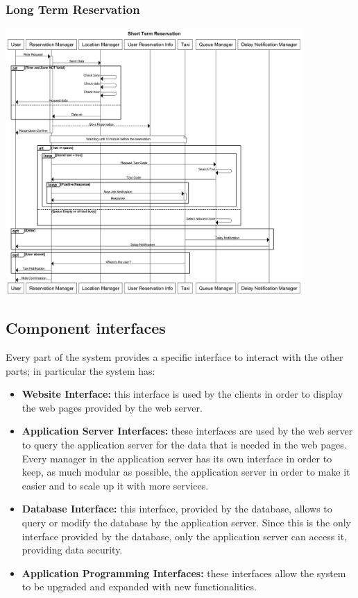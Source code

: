 	\subsubsection{Long Term Reservation}
		\begin{center}
			\includegraphics[width=0.85\textwidth]{./images/Long_Term_Reservation_Complete.png}
		\end{center}
\subsection{Component interfaces}
	Every part of the system provides a specific interface to interact with the other parts; in particular the system has:
	\begin{itemize}
		\item \textbf{Website Interface:} this interface is used by the clients in order to display the web pages provided by the web server.
		\item \textbf{Application Server Interfaces:} these interfaces are used by the web server to query the application server for the data that is needed in the web pages. Every manager in the application server has its own interface in order to keep, as much modular as possible, the application server in order to make it easier and to scale up it with more services.
		\item \textbf{Database Interface:} this interface, provided by the database, allows to query or modify the database by the application server. Since this is the only interface provided by the database, only the application server can access it, providing data security.
		\item \textbf{Application Programming Interfaces:} these interfaces allow the system to be upgraded and expanded with new functionalities.
	\end{itemize}
